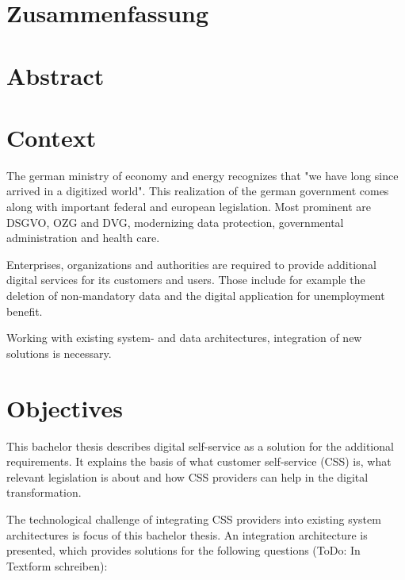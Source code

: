 \documentclass[
     12pt,         %
     a4paper,      %
     BCOR10mm,     %
     DIV14,        %
     ]{scrreprt}
\begin{document}
\chapter*{Zusammenfassung}

\newpage

\chapter*{Abstract}

\newpage

\tableofcontents
\cleardoublepage
{}

\chapter{Context}

The german ministry of economy and energy recognizes that "we have long since arrived in a digitized world". This realization 
of the german government comes along with important federal and european legislation. Most prominent are DSGVO, OZG and DVG, 
modernizing data protection, governmental administration and health care.

Enterprises, organizations and authorities are required to provide additional digital services for its customers and users.
Those include for example the deletion of non-mandatory data and the digital application for unemployment benefit.

Working with existing system- and data architectures, integration of new solutions is necessary.

\chapter{Objectives}

This bachelor thesis describes digital self-service as a solution for the additional requirements. It explains the basis of what 
customer self-service (CSS) is, what relevant legislation is about and how CSS providers can help in the digital transformation.

The technological challenge of integrating CSS providers into existing system architectures is focus of this bachelor thesis.
An integration architecture is presented, which provides solutions for the following questions (ToDo: In Textform schreiben):
\end{document}
